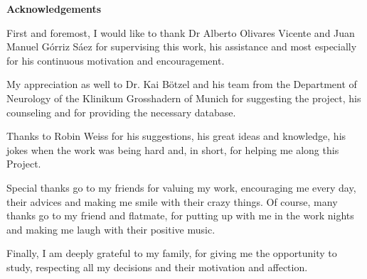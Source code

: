 \begin{titlepage}
\label{ch:acknowledgements}
{ \huge \bfseries Acknowledgements \\[0.4cm] }


First and foremost, I would like to thank Dr Alberto Olivares Vicente and Juan Manuel Górriz Sáez for supervising this work, his assistance and most especially for his continuous motivation and encouragement. 

My appreciation as well to Dr. Kai Bötzel and his team from the Department of Neurology of the Klinikum Grosshadern of Munich for suggesting the project, his counseling and for providing the necessary database.

Thanks to Robin Weiss for his suggestions, his great ideas and knowledge, his jokes when the work was being  hard and, in short, for helping me along this Project.

Special thanks go to my friends for valuing my work, encouraging me every day, their advices and making me smile with their crazy things. Of course, many thanks go to my friend and flatmate, for putting up with me in the work nights and making me laugh with their positive music.

Finally, I am deeply grateful to my family, for giving me the opportunity to study, respecting all my decisions and their motivation and affection.


\end{titlepage} 